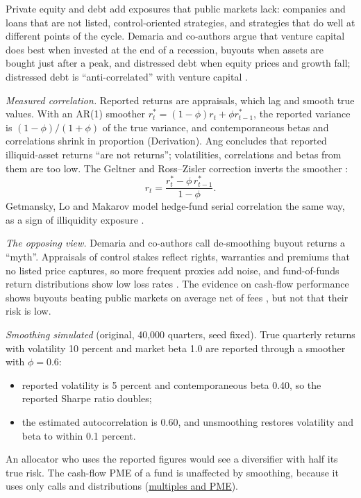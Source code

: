 \begin{qfmethod}\label{meth:private-capital-diversification}
 Private equity and debt add exposures that public markets lack: companies and loans that are not listed, control-oriented strategies, and strategies that do well at different points of the cycle. Demaria and co-authors argue that venture capital does best when invested at the end of a recession, buyouts when assets are bought just after a peak, and distressed debt when equity prices and growth fall; distressed debt is ``anti-correlated'' with venture capital \citep[pp.~162--163]{demaria-private-markets-2021}.

\emph{Measured correlation.} Reported returns are appraisals, which lag and smooth true values. With an AR(1) smoother $r^*_t=(1-\phi)r_t+\phi r^*_{t-1}$, the reported variance is $(1-\phi)/(1+\phi)$ of the true variance, and contemporaneous betas and correlations shrink in proportion (Derivation). Ang concludes that reported illiquid-asset returns ``are not returns''; volatilities, correlations and betas from them are too low. The Geltner and Ross--Zisler correction inverts the smoother \citep[pp.~416--421]{s7-ang}:
\[ r_t=\frac{r^*_t-\phi\,r^*_{t-1}}{1-\phi}. \]
Getmansky, Lo and Makarov model hedge-fund serial correlation the same way, as a sign of illiquidity exposure \citep[NBER WP 9571, abstract]{wide-getmansky-lo-makarov}.

\emph{The opposing view.} Demaria and co-authors call de-smoothing buyout returns a ``myth''. Appraisals of control stakes reflect rights, warranties and premiums that no listed price captures, so more frequent proxies add noise, and fund-of-funds return distributions show low loss rates \citep[pp.~160--166]{demaria-private-markets-2021}. The evidence on cash-flow performance shows buyouts beating public markets on average net of fees \citep[abstract]{pe-harris-jenkinson-kaplan-2014}, but not that their risk is low.

 \emph{Smoothing simulated} (original, 40,000 quarters, seed fixed). True quarterly returns with volatility 10 percent and market beta 1.0 are reported through a smoother with $\phi=0.6$:
\begin{itemize}
\item reported volatility is 5 percent and contemporaneous beta 0.40, so the reported Sharpe ratio doubles;
\item the estimated autocorrelation is 0.60, and unsmoothing restores volatility and beta to within 0.1 percent.
\end{itemize}
An allocator who uses the reported figures would see a diversifier with half its true risk. The cash-flow PME of a fund is unaffected by smoothing, because it uses only calls and distributions (\hyperref[meth:private-fund-multiples-pme]{multiples and PME}).


\end{qfmethod}
